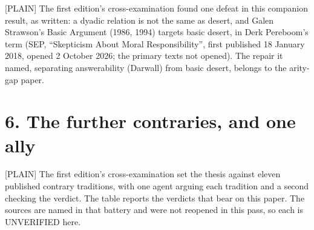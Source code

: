 \documentclass[11pt]{article}
\newcommand{\register}[1]{{\ttfamily\small #1}}
\begin{document}
\register{[PLAIN]} The first edition's cross-examination found one defeat in this companion result, as written: a dyadic relation is not the same as desert, and Galen Strawson's Basic Argument (1986, 1994) targets basic desert, in Derk Pereboom's term (SEP, ``Skepticism About Moral Responsibility'', first published 18 January 2018, opened 2 October 2026; the primary texts not opened). The repair it named, separating answerability (Darwall) from basic desert, belongs to the arity-gap paper.

\section*{6. The further contraries, and one ally}

\register{[PLAIN]} The first edition's cross-examination set the thesis against eleven published contrary traditions, with one agent arguing each tradition and a second checking the verdict. The table reports the verdicts that bear on this paper. The sources are named in that battery and were not reopened in this pass, so each is UNVERIFIED here.
\end{document}
